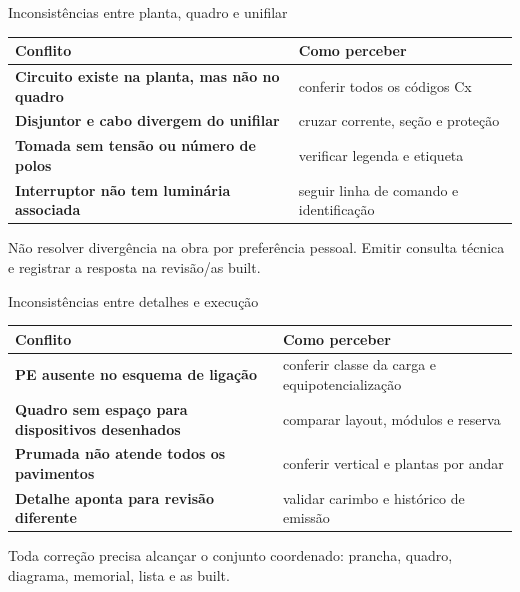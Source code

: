 \begin{frame}{Inconsistências entre planta, quadro e unifilar}
\scriptsize
\begin{tabularx}{\textwidth}{>{\bfseries}p{3.2cm}X}
\toprule
Conflito & Como perceber \\
\midrule
Circuito existe na planta, mas não no quadro & conferir todos os códigos Cx \\
Disjuntor e cabo divergem do unifilar & cruzar corrente, seção e proteção \\
Tomada sem tensão ou número de polos & verificar legenda e etiqueta \\
Interruptor não tem luminária associada & seguir linha de comando e identificação \\
\bottomrule
\end{tabularx}
\begin{caixaAt}
Não resolver divergência na obra por preferência pessoal. Emitir consulta técnica e registrar a resposta na revisão/as built.
\end{caixaAt}
\end{frame}

\begin{frame}{Inconsistências entre detalhes e execução}
\scriptsize
\begin{tabularx}{\textwidth}{>{\bfseries}p{3.2cm}X}
\toprule
Conflito & Como perceber \\
\midrule
PE ausente no esquema de ligação & conferir classe da carga e equipotencialização \\
Quadro sem espaço para dispositivos desenhados & comparar layout, módulos e reserva \\
Prumada não atende todos os pavimentos & conferir vertical e plantas por andar \\
Detalhe aponta para revisão diferente & validar carimbo e histórico de emissão \\
\bottomrule
\end{tabularx}
\begin{caixaAt}
Toda correção precisa alcançar o conjunto coordenado: prancha, quadro, diagrama, memorial, lista e as built.
\end{caixaAt}
\end{frame}

